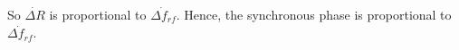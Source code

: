 \begin{itemize}
So $\dot{\Delta R}$ is proportional to $\dot{\Delta f_\mathit{rf}}$. Hence, the synchronous phase is proportional to $\dot{\Delta f_{\mathit{rf}}}$. 
%
%
%





\end{itemize}

